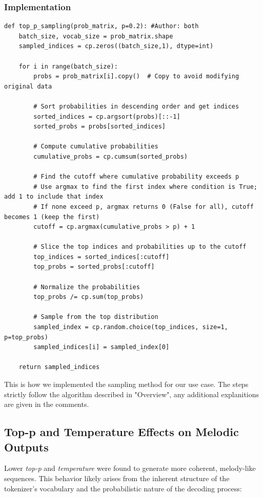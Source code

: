 \documentclass[a4paper,12pt]{extarticle}
\begin{document}
\subsubsection{Implementation}
\begin{lstlisting}
def top_p_sampling(prob_matrix, p=0.2): #Author: both
    batch_size, vocab_size = prob_matrix.shape
    sampled_indices = cp.zeros((batch_size,1), dtype=int)
    
    for i in range(batch_size):
        probs = prob_matrix[i].copy()  # Copy to avoid modifying original data
        
        # Sort probabilities in descending order and get indices
        sorted_indices = cp.argsort(probs)[::-1]
        sorted_probs = probs[sorted_indices]
        
        # Compute cumulative probabilities
        cumulative_probs = cp.cumsum(sorted_probs)
        
        # Find the cutoff where cumulative probability exceeds p
        # Use argmax to find the first index where condition is True; add 1 to include that index
        # If none exceed p, argmax returns 0 (False for all), cutoff becomes 1 (keep the first)
        cutoff = cp.argmax(cumulative_probs > p) + 1
        
        # Slice the top indices and probabilities up to the cutoff
        top_indices = sorted_indices[:cutoff]
        top_probs = sorted_probs[:cutoff]
        
        # Normalize the probabilities
        top_probs /= cp.sum(top_probs)
        
        # Sample from the top distribution
        sampled_index = cp.random.choice(top_indices, size=1, p=top_probs)
        sampled_indices[i] = sampled_index[0]
    
    return sampled_indices
\end{lstlisting}
This is how we implemented the sampling method for our use case. The steps strictly follow the algorithm described in "Overview", any additional explanitions are given in the comments. 
\subsection{Top-p and Temperature Effects on Melodic Outputs}
Lower \textit{top-p} and \textit{temperature} were found to generate more coherent, melody-like sequences. 
This behavior likely arises from the inherent structure of the tokenizer's vocabulary and the probabilistic nature of the decoding process:
\end{document}
